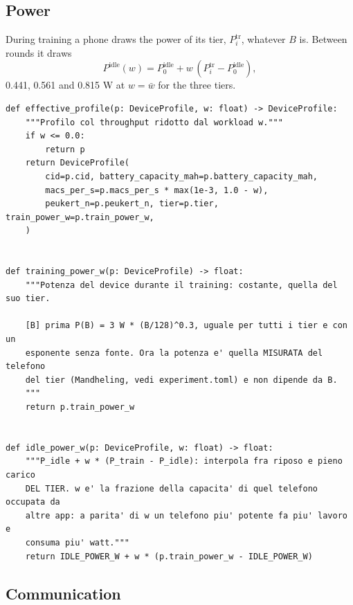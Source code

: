 \documentclass[11pt,a4paper]{article}
\begin{document}
\subsection{Power}

During training a phone draws the power of its tier, $P^{\mathrm{tr}}_i$,
whatever $B$ is. Between rounds it draws
\begin{equation}
  P^{\mathrm{idle}}(w) = P^{\mathrm{idle}}_0 + w \, (P^{\mathrm{tr}}_i - P^{\mathrm{idle}}_0) ,
  \label{eq:pidle}
\end{equation}
0.441, 0.561 and 0.815 W at $w = \bar{w}$ for the three tiers.

\begin{lstlisting}[style=py,firstnumber=37,caption={\texttt{tesifl/device/world\_state.py}, lines 37--63}]
def effective_profile(p: DeviceProfile, w: float) -> DeviceProfile:
    """Profilo col throughput ridotto dal workload w."""
    if w <= 0.0:
        return p
    return DeviceProfile(
        cid=p.cid, battery_capacity_mah=p.battery_capacity_mah,
        macs_per_s=p.macs_per_s * max(1e-3, 1.0 - w),
        peukert_n=p.peukert_n, tier=p.tier, train_power_w=p.train_power_w,
    )


def training_power_w(p: DeviceProfile) -> float:
    """Potenza del device durante il training: costante, quella del suo tier.

    [B] prima P(B) = 3 W * (B/128)^0.3, uguale per tutti i tier e con un
    esponente senza fonte. Ora la potenza e' quella MISURATA del telefono
    del tier (Mandheling, vedi experiment.toml) e non dipende da B.
    """
    return p.train_power_w


def idle_power_w(p: DeviceProfile, w: float) -> float:
    """P_idle + w * (P_train - P_idle): interpola fra riposo e pieno carico
    DEL TIER. w e' la frazione della capacita' di quel telefono occupata da
    altre app: a parita' di w un telefono piu' potente fa piu' lavoro e
    consuma piu' watt."""
    return IDLE_POWER_W + w * (p.train_power_w - IDLE_POWER_W)
\end{lstlisting}

\subsection{Communication}
\end{document}
